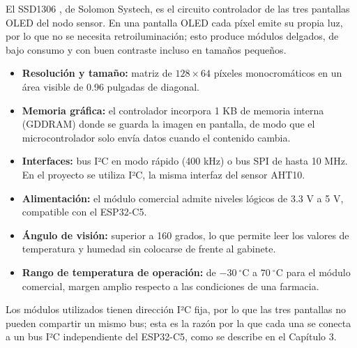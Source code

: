 El SSD1306 \cite{ssd1306-datasheet}, de Solomon Systech, es el circuito controlador de las tres pantallas OLED del nodo sensor. En una pantalla OLED cada píxel emite su propia luz, por lo que no se necesita retroiluminación; esto produce módulos delgados, de bajo consumo y con buen contraste incluso en tamaños pequeños.

\begin{itemize}
    \item \textbf{Resolución y tamaño:} matriz de $128 \times 64$ píxeles monocromáticos en un área visible de 0.96 pulgadas de diagonal.

    \item \textbf{Memoria gráfica:} el controlador incorpora 1 KB de memoria interna (GDDRAM) donde se guarda la imagen en pantalla, de modo que el microcontrolador solo envía datos cuando el contenido cambia.

    \item \textbf{Interfaces:} bus I²C en modo rápido (400 kHz) o bus SPI de hasta 10 MHz. En el proyecto se utiliza I²C, la misma interfaz del sensor AHT10.

    \item \textbf{Alimentación:} el módulo comercial admite niveles lógicos de 3.3 V a 5 V, compatible con el ESP32-C5.

    \item \textbf{Ángulo de visión:} superior a 160 grados, lo que permite leer los valores de temperatura y humedad sin colocarse de frente al gabinete.

    \item \textbf{Rango de temperatura de operación:} de $-30~^{\circ}\text{C}$ a $70~^{\circ}\text{C}$ para el módulo comercial, margen amplio respecto a las condiciones de una farmacia.
\end{itemize}

Los módulos utilizados tienen dirección I²C fija, por lo que las tres pantallas no pueden compartir un mismo bus; esta es la razón por la que cada una se conecta a un bus I²C independiente del ESP32-C5, como se describe en el Capítulo 3.
